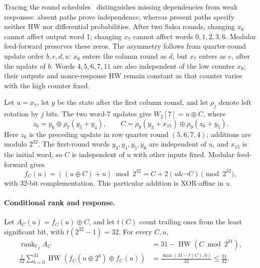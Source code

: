 
Tracing the round schedules~\citep{nir2018,bernstein2008salsa} distinguishes missing dependencies from weak responses: absent paths prove independence, whereas present paths specify neither HW nor differential probabilities. After two Salsa rounds, changing $x_6$ cannot affect output word 1; changing $x_7$ cannot affect words $0,1,2,3,6$. Modular feed-forward preserves these zeros. The asymmetry follows from quarter-round update order $b,c,d,a$: $x_6$ enters the column round as $d$, but $x_7$ enters as $c$, after the update of $b$. Words $4,5,6,7,11$ are also independent of the low counter $x_8$; their outputs and nonce-response HW remain constant as that counter varies with the high counter fixed.

Let $u=x_7$, let $y$ be the state after the first column round, and let $\rho_j$ denote left rotation by $j$ bits. The two word-7 updates give $W_2[7]=u\oplus C$, where
\[
 z_6=y_6\oplus\rho_7(y_5+y_4),\qquad
 C=\rho_9(y_3+x_{15})\oplus\rho_9(z_6+y_5).
\]
Here $z_6$ is the preceding update in row quarter round $(5,6,7,4)$; additions are modulo $2^{32}$. The first-round words $y_3,y_4,y_5,y_6$ are independent of $u$, and $x_{15}$ is the initial word, so $C$ is independent of $u$ with other inputs fixed. Modular feed-forward gives
\begin{equation}
 f_C(u)=((u\oplus C)+u)\bmod2^{32}
       =C+2(u\mathbin{\&}\neg C)\pmod{2^{32}},
 \label{eq:compactfC}
\end{equation}
with 32-bit complementation. This particular addition is XOR-affine in $u$.

\paragraph{Conditional rank and response.}
Let $A_C(u)=f_C(u)\oplus C$, and let $t(C)$ count trailing ones from the least significant bit, with $t(2^{32}-1)=32$. For every $C,u$,
\begin{equation}
\begin{aligned}
 \operatorname{rank}_{\mathbb F_2}A_C
   &=31-\operatorname{HW}(C\bmod2^{31}),\\
 \frac1{32}\sum_{b=0}^{31}\operatorname{HW}\!\left(f_C(u\oplus2^b)\oplus f_C(u)\right)
   &=\frac{\max(31-t(C),0)}{32}\leq\frac{31}{32}.
\end{aligned}
\label{eq:affinecorollary}
\end{equation}

